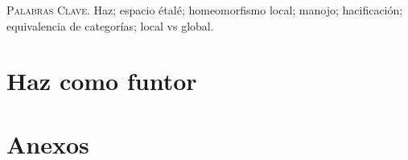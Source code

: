 \documentclass[letterpaper]{article} %
\date{}
\numberwithin{theorem}{section}
\numberwithin{definition}{section}
\renewenvironment{abstract}
{\small
   \list{}{%
      \setlength{\leftmargin}{1.4cm}%
      \setlength{\rightmargin}{\leftmargin}%
   }%
   \item\relax}
{\endlist}
\begin{document}
   
   \vspace{1cm}

   \begin{abstract}
      
        
      \vspace{0.3cm}
      \textsc{Palabras Clave.} Haz; espacio étalé; homeomorfismo local; manojo; hacificación; equivalencia de categorías; local vs global.
   \end{abstract}

   \vspace{1cm}

   \section{Haz como funtor}
      
   \section{Anexos}
      
\end{document}
